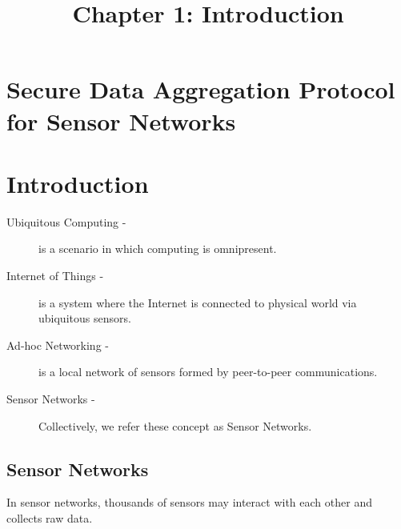 \documentclass[%
  slidesonly,%
  semlayer%
  ]{seminar}                                  %
\title{Chapter 1: Introduction}
\author{}
\date{}
\date{}
\begin{document}


\maketitle          %

\begin{slide}
  \ifslidesonly              %
    \addtocounter{slide}{-1}
  \fi
\end{slide}


\begin{slide}

\footnotesize

\section*{Secure Data Aggregation Protocol for Sensor Networks}
  \clearpage

\section*{Introduction}
  \begin{description}
    \item[Ubiquitous Computing -] is a scenario in which computing is omnipresent.

    \item[Internet of Things -] is a system where the Internet is connected to physical world via ubiquitous sensors.
    
    \item[Ad-hoc Networking -] is a local network of sensors formed by peer-to-peer communications.
    
    \item[Sensor Networks -] Collectively, we refer these concept as Sensor Networks.
  \end{description}
  
  \clearpage

  \subsection*{Sensor Networks}
    In sensor networks, thousands of sensors may interact with each other and collects raw data.


\end{slide}
\end{document}
